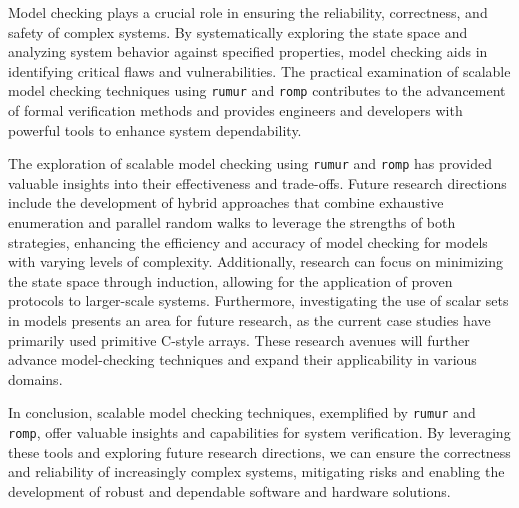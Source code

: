 Model checking plays a crucial role in ensuring the reliability, correctness,
and safety of complex systems.
By systematically exploring the state space and analyzing system behavior
against specified properties, model checking aids in identifying critical
flaws and vulnerabilities.
The practical examination of scalable model checking techniques using
\texttt{rumur} and \texttt{romp} contributes to the advancement of
formal verification methods and provides engineers and developers with
powerful tools to enhance system dependability.

The exploration of scalable model checking using \texttt{rumur} and
\texttt{romp} has provided valuable insights into their effectiveness and
trade-offs.
Future research directions include the development of hybrid approaches that
combine exhaustive enumeration and parallel random walks to leverage the
strengths of both strategies, enhancing the efficiency and accuracy of model
checking for models with varying levels of complexity.
Additionally, research can focus on minimizing the state space through
induction, allowing for the application of proven protocols to larger-scale
systems.
Furthermore, investigating the use of scalar sets in models presents an area
for future research, as the current case studies have primarily used
primitive C-style arrays.
These research avenues will further advance model-checking techniques and
expand their applicability in various domains.

In conclusion, scalable model checking techniques, exemplified by
\texttt{rumur} and \texttt{romp}, offer valuable insights and capabilities
for system verification.
By leveraging these tools and exploring future research directions,
we can ensure the correctness and reliability of increasingly complex systems,
mitigating risks and enabling the development of robust and dependable
software and hardware solutions.
